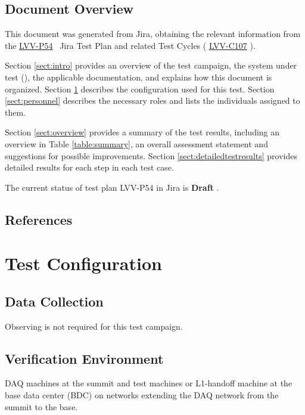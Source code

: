 \documentclass[DM,lsstdraft,STR,toc]{lsstdoc}
\begin{document}
\subsection{Document Overview}
\label{sect:docoverview}

This document was generated from Jira, obtaining the relevant information from the 
\href{https://jira.lsstcorp.org/secure/Tests.jspa#/testPlan/LVV-P54}{LVV-P54}
~Jira Test Plan and related Test Cycles (
  \href{https://jira.lsstcorp.org/secure/Tests.jspa#/testCycle/LVV-C107}{LVV-C107}
).

Section \ref{sect:intro} provides an overview of the test campaign, the system under test (\product{}), the applicable documentation, and explains how this document is organized.
Section \ref{sect:configuration}  describes the configuration used for this test.
Section \ref{sect:personnel} describes the necessary roles and lists the individuals assigned to them.

Section \ref{sect:overview} provides a summary of the test results, including an overview in Table \ref{table:summary}, an overall assessment statement and suggestions for possible improvements.
Section \ref{sect:detailedtestresults} provides detailed results for each step in each test case.

The current status of test plan LVV-P54 in Jira is \textbf{ Draft }.

\subsection{References}
\label{sect:references}
\renewcommand{\refname}{}

\section{Test Configuration}
\label{sect:configuration}

\subsection{Data Collection}

  Observing is not required for this test campaign.

\subsection{Verification Environment}
\label{sect:hwconf}
  DAQ machines at the summit and test machines or L1-handoff machine at
the base data center (BDC) on networks extending the DAQ network from
the summit to the base.~~
\end{document}
